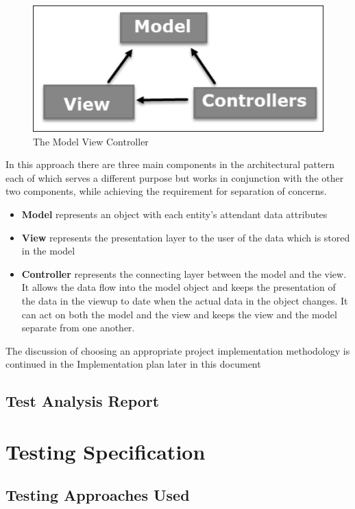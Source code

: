 \documentclass[a4paper,12pt]{article}
\begin{document}
 \begin{figure}[h!]

\includegraphics{mvc.jpg}
  \caption{The Model View Controller}
  \label{fig:model view controller}
\end{figure}
In this approach there are three main components in the architectural pattern each of which serves a different purpose but works in conjunction with the other two components, while achieving the requirement for separation of concerns.

\begin{itemize}
\item \textbf{Model} represents an object with each entity's attendant data attributes 
\item \textbf{View} represents the presentation layer to the user of the data which is stored in the model
\item \textbf{Controller} represents the connecting layer between the model and the view. It allows the data flow into the model object and keeps the presentation of the data in the viewup to date when the actual data in the object changes. It can act on both the model and the view and keeps the view and the model separate from one another.
\end{itemize}

The discussion of choosing an appropriate project implementation methodology is continued in the Implementation plan later in this document

\subsection {Test Analysis Report}

\section {Testing Specification}
\subsection {Testing Approaches Used}
\end{document}
